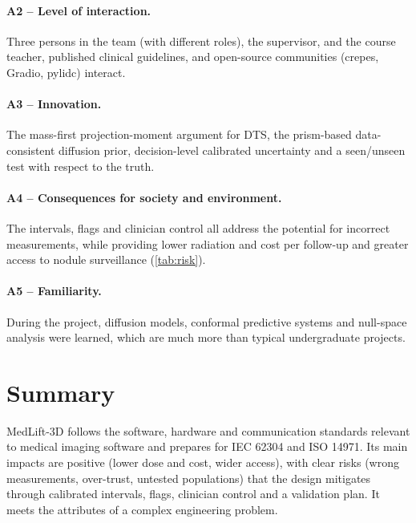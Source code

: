 \paragraph{A2 -- Level of interaction.} Three persons in the team (with different roles), the supervisor, and the course teacher, published clinical guidelines, and open-source communities (crepes, Gradio, pylidc) interact.

\paragraph{A3 -- Innovation.} The mass-first projection-moment argument for DTS, the prism-based data-consistent diffusion prior, decision-level calibrated uncertainty and a seen/unseen test with respect to the truth.

\paragraph{A4 -- Consequences for society and environment.} The intervals, flags and clinician control all address the potential for incorrect measurements, while providing lower radiation and cost per follow-up and greater access to nodule surveillance (\cref{tab:risk}).

\paragraph{A5 -- Familiarity.} During the project, diffusion models, conformal predictive systems and null-space analysis were learned, which are much more than typical undergraduate projects.

\section{Summary}

MedLift-3D follows the software, hardware and communication standards relevant to medical imaging software and prepares for IEC 62304 and ISO 14971. Its main impacts are positive (lower dose and cost, wider access), with clear risks (wrong measurements, over-trust, untested populations) that the design mitigates through calibrated intervals, flags, clinician control and a validation plan. It meets the attributes of a complex engineering problem.
